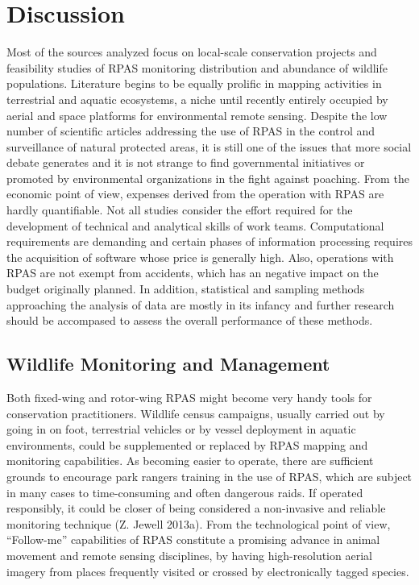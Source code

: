 \documentclass[]{interact}
\theoremstyle{plain}%
\theoremstyle{definition}
\theoremstyle{remark}
\begin{document}
\section{Discussion}\label{discussion}

Most of the sources analyzed focus on local-scale conservation projects
and feasibility studies of RPAS monitoring distribution and abundance of
wildlife populations. Literature begins to be equally prolific in
mapping activities in terrestrial and aquatic ecosystems, a niche until
recently entirely occupied by aerial and space platforms for
environmental remote sensing. Despite the low number of scientific
articles addressing the use of RPAS in the control and surveillance of
natural protected areas, it is still one of the issues that more social
debate generates and it is not strange to find governmental initiatives
or promoted by environmental organizations in the fight against
poaching. From the economic point of view, expenses derived from the
operation with RPAS are hardly quantifiable. Not all studies consider
the effort required for the development of technical and analytical
skills of work teams. Computational requirements are demanding and
certain phases of information processing requires the acquisition of
software whose price is generally high. Also, operations with RPAS are
not exempt from accidents, which has an negative impact on the budget
originally planned. In addition, statistical and sampling methods
approaching the analysis of data are mostly in its infancy and further
research should be accompased to assess the overall performance of these
methods.

\subsection{Wildlife Monitoring and
Management}\label{wildlife-monitoring-and-management-1}

Both fixed-wing and rotor-wing RPAS might become very handy tools for
conservation practitioners. Wildlife census campaigns, usually carried
out by going in on foot, terrestrial vehicles or by vessel deployment in
aquatic environments, could be supplemented or replaced by RPAS mapping
and monitoring capabilities. As becoming easier to operate, there are
sufficient grounds to encourage park rangers training in the use of
RPAS, which are subject in many cases to time-consuming and often
dangerous raids. If operated responsibly, it could be closer of being
considered a non-invasive and reliable monitoring technique (Z. Jewell
2013a). From the technological point of view, ``Follow-me'' capabilities
of RPAS constitute a promising advance in animal movement and remote
sensing disciplines, by having high-resolution aerial imagery from
places frequently visited or crossed by electronically tagged species.
\end{document}
